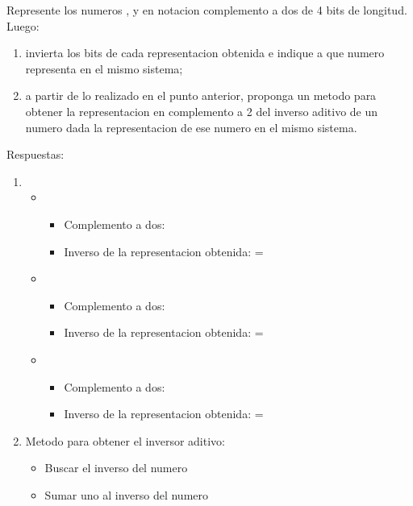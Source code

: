 \begin{enunciado}{\ejercicio}
Represente los numeros ,  y  en notacion complemento a dos de 4 bits de
longitud. Luego:
\begin{enumerate}[label=(\alph*)]
    \item invierta los bits de cada representacion obtenida e indique a que numero representa en
    el mismo sistema;
    \item a partir de lo realizado en el punto anterior, proponga un metodo para obtener la representacion en 
    complemento a 2 del inverso aditivo de un numero dada la representacion de ese numero en el mismo 
    sistema.
\end{enumerate}
Respuestas: 

\begin{enumerate}[label=(\alph*)]
    \item \begin{itemize}
        \item {}
        \begin{itemize}
            \item Complemento a dos:  
            \item Inverso de la representacion obtenida:  =  
        \end{itemize}
        \item {}
        \begin{itemize}
            \item Complemento a dos: 
            \item Inverso de la representacion obtenida:  =  
        \end{itemize}
        \item {}
        \begin{itemize}
            \item Complemento a dos: 
            \item Inverso de la representacion obtenida:  =  
        \end{itemize}
    \end{itemize}
    \item Metodo para obtener el inversor aditivo:
    \begin{itemize}
        \item Buscar el inverso del numero
        \item Sumar uno al inverso del numero
    \end{itemize}
\end{enumerate}
\end{enunciado}
